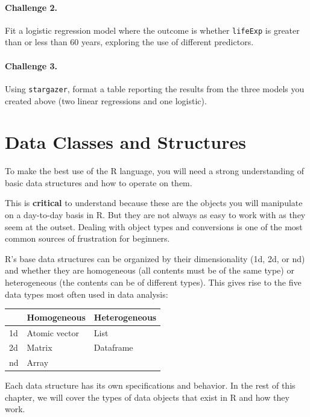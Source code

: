 \documentclass[
]{book}
\begin{document}
\hypertarget{challenge-2.-7}{%
\subsubsection*{Challenge 2.}\label{challenge-2.-7}}

Fit a logistic regression model where the outcome is whether \texttt{lifeExp} is greater than or less than 60 years, exploring the use of different predictors.

\hypertarget{challenge-3.-5}{%
\subsubsection*{Challenge 3.}\label{challenge-3.-5}}

Using \texttt{stargazer}, format a table reporting the results from the three models you created above (two linear regressions and one logistic).

\hypertarget{data-classes-and-structures}{%
\chapter{Data Classes and Structures}\label{data-classes-and-structures}}

To make the best use of the R language, you will need a strong understanding of basic data structures and how to operate on them.

This is \textbf{critical} to understand because these are the objects you will manipulate on a day-to-day basis in R. But they are not always as easy to work with as they seem at the outset. Dealing with object types and conversions is one of the most common sources of frustration for beginners.

R's base data structures can be organized by their dimensionality (1d, 2d, or nd) and whether they are homogeneous (all contents must be of the same type) or heterogeneous (the contents can be of different types). This gives rise to the five data types most often used in data analysis:

\begin{longtable}[]{@{}lll@{}}
\toprule
& Homogeneous & Heterogeneous\tabularnewline
\midrule
\endhead
1d & Atomic vector & List\tabularnewline
2d & Matrix & Dataframe\tabularnewline
nd & Array &\tabularnewline
\bottomrule
\end{longtable}

Each data structure has its own specifications and behavior. In the rest of this chapter, we will cover the types of data objects that exist in R and how they work.
\end{document}

